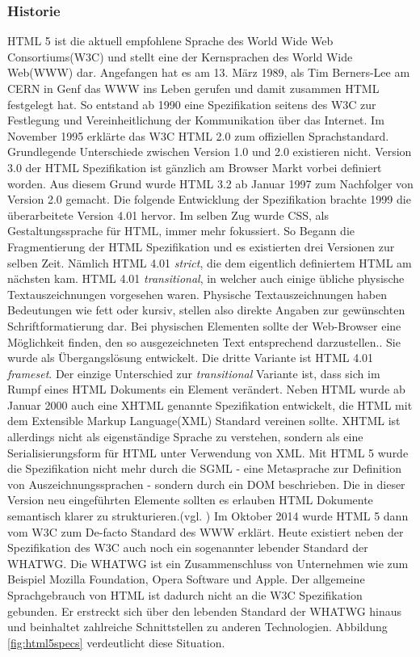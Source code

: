 \subsubsection{Historie} HTML 5 ist die aktuell empfohlene Sprache des World Wide Web Consortiums(W3C) und stellt eine der Kernsprachen des World Wide Web(WWW) dar. Angefangen hat es am 13. März 1989, als Tim Berners-Lee am CERN in Genf das WWW ins Leben gerufen und damit zusammen HTML festgelegt hat. So entstand ab 1990 eine Spezifikation seitens des W3C zur Festlegung und Vereinheitlichung der Kommunikation über das Internet. Im November 1995 erklärte das W3C HTML 2.0 zum offiziellen Sprachstandard. Grundlegende Unterschiede zwischen Version 1.0 und 2.0 existieren nicht. Version 3.0 der HTML Spezifikation ist gänzlich am Browser Markt vorbei definiert worden. Aus diesem Grund wurde HTML 3.2 ab Januar 1997 zum Nachfolger von Version 2.0 gemacht. Die folgende Entwicklung der Spezifikation brachte 1999 die überarbeitete Version 4.01 hervor. Im selben Zug wurde CSS, als Gestaltungssprache für HTML, immer mehr fokussiert. So Begann die Fragmentierung der HTML Spezifikation und es existierten drei Versionen zur selben Zeit. Nämlich HTML 4.01 \textit{strict}, die dem eigentlich definiertem HTML am nächsten kam. HTML 4.01 \textit{transitional}, in welcher auch einige übliche physische Textauszeichnungen vorgesehen waren. \glqq Physische Textauszeichnungen haben Bedeutungen wie \glqq fett\grqq{} oder \glqq kursiv\grqq{}, stellen also direkte Angaben zur gewünschten Schriftformatierung dar. Bei physischen Elementen sollte der Web-Browser eine Möglichkeit finden, den so ausgezeichneten Text entsprechend darzustellen.\grqq{}\cite{SelfHTML20141}. Sie wurde als Übergangslösung entwickelt. Die dritte Variante ist HTML 4.01 \textit{frameset}. Der einzige Unterschied zur \textit{transitional} Variante ist, dass sich im Rumpf eines HTML Dokuments ein Element verändert. Neben HTML wurde ab Januar 2000 auch eine XHTML genannte Spezifikation entwickelt, die HTML mit dem Extensible Markup Language(XML) Standard vereinen sollte. XHTML ist allerdings nicht als eigenständige Sprache zu verstehen, sondern als eine Serialisierungsform für HTML unter Verwendung von XML. Mit HTML 5 wurde die Spezifikation nicht mehr durch die SGML - eine Metasprache zur Definition von Auszeichnungssprachen - sondern durch ein DOM beschrieben. Die in dieser Version neu eingeführten Elemente sollten es erlauben HTML Dokumente semantisch klarer zu strukturieren.(vgl. \cite[S.20ff]{MunzHTML2012}) Im Oktober 2014 wurde HTML 5 dann vom W3C zum De-facto Standard des WWW erklärt. Heute existiert neben der Spezifikation des W3C auch noch ein sogenannter \glqq lebender Standard\grqq{} der WHATWG. Die WHATWG ist ein Zusammenschluss von Unternehmen wie zum Beispiel Mozilla Foundation, Opera Software und Apple. Der allgemeine Sprachgebrauch von HTML ist dadurch nicht an die W3C Spezifikation gebunden. Er erstreckt sich über den \glqq lebenden Standard\grqq{} der WHATWG hinaus und beinhaltet zahlreiche Schnittstellen zu anderen Technologien. Abbildung \ref{fig:html5specs} verdeutlicht diese Situation.
	
